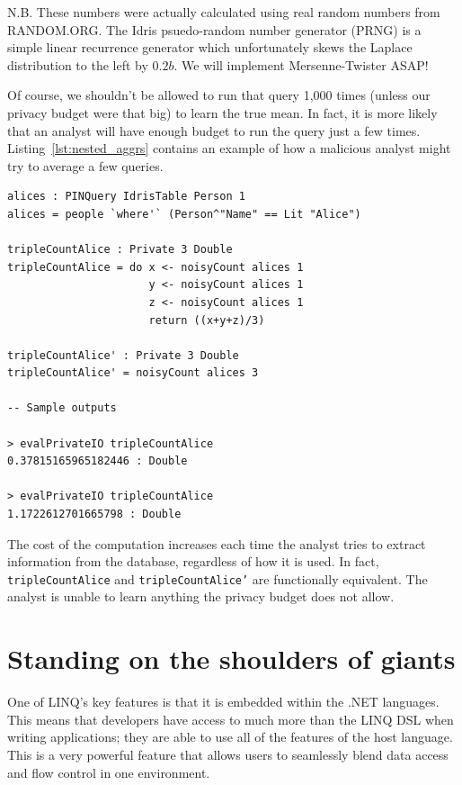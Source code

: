 \documentclass[12pt]{report}
\begin{document}
{\color{red}
  N.B. These numbers were actually calculated using real random numbers from RANDOM.ORG.
  The Idris psuedo-random number generator (PRNG) is a simple linear recurrence generator which unfortunately skews the Laplace distribution to the left by $0.2b$.
  We will implement Mersenne-Twister ASAP!
}

Of course, we shouldn't be allowed to run that query 1,000 times (unless our privacy budget were that big) to learn the true mean.
In fact, it is more likely that an analyst will have enough budget to run the query just a few times.
Listing~\ref{lst:nested_aggrs} contains an example of how a malicious analyst might try to average a few queries.

\begin{lstlisting}[caption={Counting Alices (revisited)},label={lst:nested_aggrs}]
alices : PINQuery IdrisTable Person 1
alices = people `where'` (Person^"Name" == Lit "Alice")

tripleCountAlice : Private 3 Double
tripleCountAlice = do x <- noisyCount alices 1
                      y <- noisyCount alices 1
                      z <- noisyCount alices 1
                      return ((x+y+z)/3)

tripleCountAlice' : Private 3 Double
tripleCountAlice' = noisyCount alices 3

-- Sample outputs

> evalPrivateIO tripleCountAlice
0.37815165965182446 : Double

> evalPrivateIO tripleCountAlice
1.1722612701665798 : Double
\end{lstlisting}

The cost of the computation increases each time the analyst tries to extract information from the database, regardless of how it is used.
In fact, \texttt{tripleCountAlice} and \texttt{tripleCountAlice'} are functionally equivalent.
The analyst is unable to learn anything the privacy budget does not allow.

\section{Standing on the shoulders of giants}

One of LINQ's key features is that it is embedded within the .NET languages.
This means that developers have access to much more than the LINQ DSL when writing applications; they are able to use all of the features of the host language.
This is a very powerful feature that allows users to seamlessly blend data access and flow control in one environment.
\end{document}
